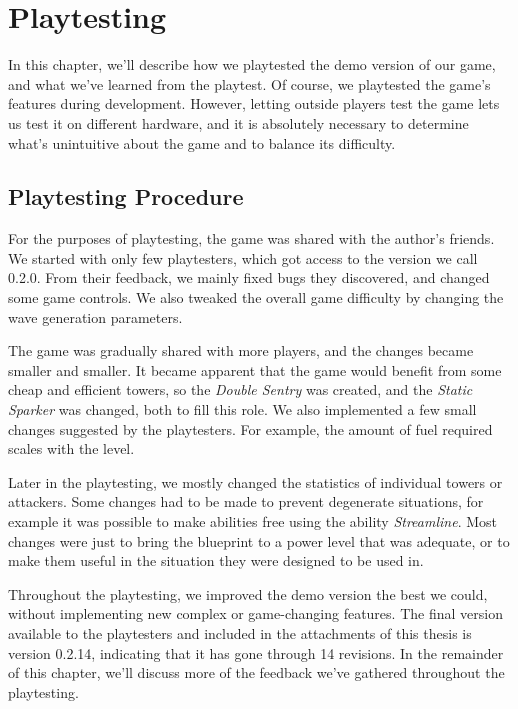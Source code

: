 \chapter{Playtesting}\label{playtesting}

In this chapter, we'll describe how we playtested the demo version of our game, and what we've learned from the playtest.
Of course, we playtested the game's features during development.
However, letting outside players test the game lets us test it on different hardware, and it is absolutely necessary to determine what's unintuitive about the game and to balance its difficulty.

\section{Playtesting Procedure}

For the purposes of playtesting, the game was shared with the author's friends.
We started with only few playtesters, which got access to the version we call 0.2.0.
From their feedback, we mainly fixed bugs they discovered, and changed some game controls.
We also tweaked the overall game difficulty by changing the wave generation parameters.

The game was gradually shared with more players, and the changes became smaller and smaller.
It became apparent that the game would benefit from some cheap and efficient towers, so the \emph{Double Sentry} was created, and the \emph{Static Sparker} was changed, both to fill this role.
We also implemented a few small changes suggested by the playtesters.
For example, the amount of fuel required scales with the level.

Later in the playtesting, we mostly changed the statistics of individual towers or attackers.
Some changes had to be made to prevent degenerate situations, for example it was possible to make abilities free using the ability \emph{Streamline}.
Most changes were just to bring the blueprint to a power level that was adequate, or to make them useful in the situation they were designed to be used in.

Throughout the playtesting, we improved the demo version the best we could, without implementing new complex or game-changing features.
The final version available to the playtesters and included in the attachments of this thesis is version 0.2.14, indicating that it has gone through 14 revisions.
In the remainder of this chapter, we'll discuss more of the feedback we've gathered throughout the playtesting.

